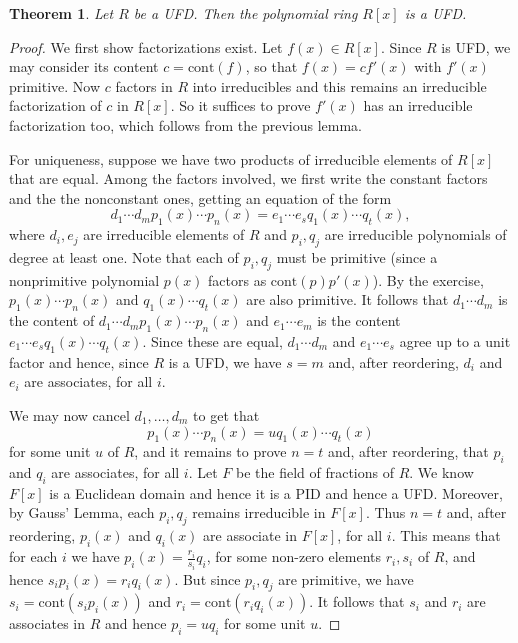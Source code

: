 \documentclass[12pt]{report}
\newtheorem{theorem}{Theorem}[chapter]
\numberwithin{equation}{section}
\numberwithin{theorem}{chapter}
\theoremstyle{definition}
\newtheorem*{basic properties}{Basic Properties}
\newtheorem*{Important Remark}{Important Remark}
\begin{document}
\begin{theorem} Let $R$ be a UFD. Then the polynomial ring $R[x]$ is a UFD.
\end{theorem}
\begin{proof}
We first show factorizations exist.
Let $f(x) \in R[x]$.
Since $R$ is UFD, we may consider its content $c = \mathrm{cont}(f)$,
 so that $f(x) = c f'(x)$ with $f'(x)$ primitive.
Now $c$ factors in $R$ into irreducibles and this remains an irreducible
factorization of $c$ in $R[x]$. So it suffices to prove $f'(x)$ has an
irreducible factorization too, which follows from the previous lemma.

For uniqueness, suppose we have two products of irreducible elements of $R[x]$ that are equal. Among the factors involved, we first write the
constant factors and the the nonconstant ones, getting an equation of the form
$$
d_1 \cdots d_m p_1(x) \cdots p_n(x) =
e_1 \cdots e_s q_1(x) \cdots q_t(x),
$$
where $d_i, e_j$ are irreducible elements of $R$ and $p_i, q_j$ are
irreducible polynomials of degree at least one. Note that each of
$p_i, q_j$ must be primitive  (since a nonprimitive polynomial $p(x)$
factors as $\mathrm{cont}(p) p'(x)$).
By the exercise, $p_1(x) \cdots p_n(x)$ and $q_1(x) \cdots q_t(x)$ are also primitive. It follows that
$d_1 \cdots d_m$ is the content of
$d_1 \cdots d_m p_1(x) \cdots p_n(x)$ and
 $e_1 \cdots e_m$ is the content $e_1 \cdots e_s q_1(x) \cdots q_t(x)$. Since these are equal, $d_1 \cdots d_m$ and $e_1
 \cdots e_s$ agree up to a unit factor and hence, since $R$ is a UFD,
 we have $s = m$ and, after reordering, $d_i$ and $e_i$ are
 associates,  for all $i$.

We may now cancel $d_1, \dots, d_m$ to get that
$$
p_1(x) \cdots p_n(x) = u q_1(x) \cdots q_t(x)
$$
for some unit $u$ of $R$, and it remains to prove $n = t$ and, after
reordering, that $p_i$ and  $q_i$ are associates, for all $i$.
Let $F$ be the field of fractions of $R$.  We know $F[x]$ is a Euclidean domain and
hence it is a PID and hence a UFD. Moreover, by Gauss' Lemma, each $p_i, q_j$ remains irreducible in $F[x]$.
Thus $n = t$ and, after reordering, $p_i(x)$ and $q_i(x)$ are associate in $F[x]$, for all $i$. This means that for each $i$ we have $p_i(x) = \frac{r_i}{s_i} q_i$, for some non-zero elements $r_i,s_i$ of $R$,   and hence $s_i p_i(x) = r_i q_i(x)$. But since $p_i, q_j$ are primitive, we have $s_i = \mathrm{cont}(s_i p_i(x))$
and  $r_i = \mathrm{cont}(r_i q_i(x))$. It follows that  $s_i$ and  $r_i$ are
associates in $R$ and hence $p_i = u q_i$ for some unit $u$.
\end{proof}
\end{document}
